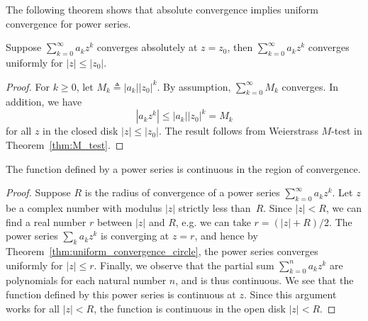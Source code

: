 The following theorem shows that absolute convergence implies uniform convergence for power series.

\begin{svgraybox}
	\begin{theorem}
		Suppose  $\sum_{k=0}^\infty a_k z^k$ converges absolutely at $z=z_0$, then $\sum_{k=0}^\infty a_k z^k$ converges uniformly for $|z| \leq |z_0|$.
		\label{thm:uniform_convergence_circle}
	\end{theorem}
\end{svgraybox}


\begin{proof} 	For $k\geq 0$, let $M_k \triangleq |a_k| |z_0|^k$. By assumption, $\sum_{k=0}^\infty M_k$ converges. In addition, we have
	$$	
	|a_k z^k| \leq |a_k| |z_0|^k = M_k
	$$
	for all $z$ in the closed disk $|z|\leq |z_0|$.
	The result follows from Weierstrass $M$-test in Theorem~\ref{thm:M_test}.
\end{proof}

\begin{svgraybox}
	\begin{theorem}
		The function defined by a power series is continuous in the region of convergence. \label{thm:power_series_continuous}
	\end{theorem}
\end{svgraybox}

\begin{proof}
	Suppose $R$ is the radius of convergence of a power series $\sum_{k=0}^\infty a_k z^k$. Let $z$ be a complex number with modulus $|z|$ strictly less than~$R$. Since $|z|<R$, we can find a real number $r$ between $|z|$ and $R$, e.g. we can take $r=(|z|+R)/2$. The power series $\sum_k a_k z^k$ is converging at $z=r$, and hence by Theorem~\ref{thm:uniform_convergence_circle}, the power series converges uniformly for $|z|\leq r$. Finally, we observe that the partial sum $\sum_{k=0}^n a_k z^k$ are polynomials for each natural number $n$, and is thus continuous. We see that the function defined by this power series is continuous at $z$. Since this argument works for all $|z|<R$, the function is continuous in the open disk $|z|<R$.
\end{proof}


